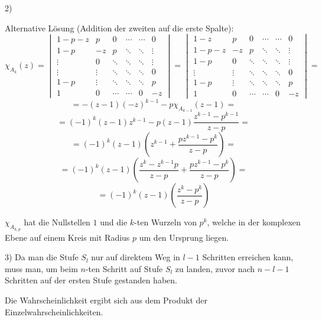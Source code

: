 \begin{paragraph}{2)}
\begin{itemize}
      Alternative Lösung (Addition der zweiten auf die erste Spalte):
      \[ \chi_{A_{k}}(z) = \begin{vmatrix}
                            1-p-z & p  & 0  & \cdots & \cdots & 0 \\
                            1-p & -z & p  & \ddots & \ddots & \vdots \\
                            \vdots & 0  & \ddots & \ddots & \ddots & \vdots \\
                            \vdots & \vdots  & \ddots & \ddots & \ddots & 0 \\
                            1-p & \vdots  & \ddots & \ddots & \ddots & p \\
                            1 & 0 & \cdots & \cdots & 0 & -z
                           \end{vmatrix}
                        = \begin{vmatrix}
                            1-z & p  & 0  & \cdots & \cdots & 0 \\
                            1-p-z & -z & p  & \ddots & \ddots &\vdots \\
                            1-p & 0  & \ddots & \ddots & \ddots & \vdots \\
                            \vdots & \vdots  & \ddots & \ddots & \ddots & 0 \\
                            1-p & \vdots  & \ddots & \ddots & \ddots & p \\
                            1 & 0 & \cdots & \cdots & 0 & -z
                           \end{vmatrix} = \]
      \[ = -(z - 1) (-z)^{k-1} - p\chi_{A_{k-1}}(z-1) = \]
      \[ = (-1)^{k}(z - 1) z^{k-1} - p(z-1)\frac{z^{k-1}-p^{k-1}}{z-p} = \]
      \[ = (-1)^{k}(z - 1) \left( z^{k-1} + \frac{pz^{k-1}-p^{k}}{z-p} \right) = \]
      \[ = (-1)^{k}(z - 1) \left( \frac{z^{k}-z^{k-1}p}{z-p} +
                          \frac{pz^{k-1}-p^{k}}{z-p} \right) = \]
      \[ = (-1)^{k}(z - 1) \left( \frac{z^{k}-p^{k}}{z-p} \right) \]

      $\chi_{A_{k,p}}$ hat die Nullstellen $1$ und die $k$-ten Wurzeln von
      $p^{k}$, welche in der komplexen Ebene auf einem Kreis mit Radius $p$ um
      den Ursprung liegen.
  \end{itemize}
\end{paragraph}
\begin{paragraph}{3)}
  Da man die Stufe $S_{l}$ nur auf direktem Weg in $l - 1$ Schritten erreichen
  kann, muss man, um beim $n$-ten Schritt auf Stufe $S_{l}$ zu landen, zuvor
  nach $n - l - 1$ Schritten auf der ersten Stufe gestanden haben.

  Die Wahrscheinlichkeit ergibt sich aus dem Produkt der
  Einzelwahrscheinlichkeiten.
\end{paragraph}
